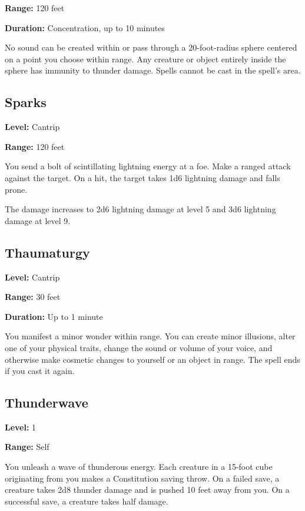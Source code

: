 \documentclass[12pt,letterpaper,twocolumn,openany,nodeprecatedcode,bg=none]{dndbook}
\let\oldsubsection\subsection
\renewcommand{\subsection}[1]{%
  \needspace{5\baselineskip}%
  \oldsubsection{#1}%
}
\begin{document}
\textbf{Range:} 120 feet

\textbf{Duration:} Concentration, up to 10 minutes

No sound can be created within or pass through a 20-foot-radius sphere
centered on a point you choose within range. Any creature or object
entirely inside the sphere has immunity to thunder damage. Spells cannot
be cast in the spell's area.

\newpage

\subsection{Sparks}\label{sparks}

\textbf{Level:} Cantrip

\textbf{Range:} 120 feet

You send a bolt of scintillating lightning energy at a foe. Make a
ranged attack against the target. On a hit, the target takes 1d6
lightning damage and falls prone.

The damage increases to 2d6 lightning damage at level 5 and 3d6
lightning damage at level 9.

\subsection{Thaumaturgy}\label{thaumaturgy}

\textbf{Level:} Cantrip

\textbf{Range:} 30 feet

\textbf{Duration:} Up to 1 minute

You manifest a minor wonder within range. You can create minor
illusions, alter one of your physical traits, change the sound or volume
of your voice, and otherwise make cosmetic changes to yourself or an
object in range. The spell ends if you cast it again.

\newpage

\subsection{Thunderwave}\label{thunderwave}

\textbf{Level:} 1

\textbf{Range:} Self

You unleash a wave of thunderous energy. Each creature in a 15-foot cube
originating from you makes a Constitution saving throw. On a failed
save, a creature takes 2d8 thunder damage and is pushed 10 feet away
from you. On a successful save, a creature takes half damage.
\end{document}
